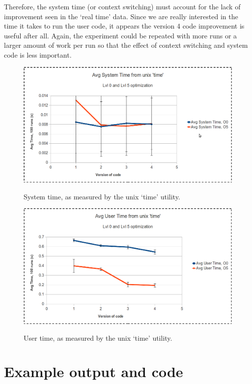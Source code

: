 \documentclass{article}
\begin{document}
Therefore, the system time (or context switching) must account for the lack of improvement seen in the `real time' data. Since we are really interested in the time it takes to run the user code, it appears the version 4 code improvement is useful after all. Again, the experiment could be repeated with more runs or a larger amount of work per run so that the effect of context switching and system code is less important. 
\begin{figure}[H]  
\centering
\caption{System time, as measured by the unix `time' utility.}
\includegraphics[scale=.40]{system_time.png}
\label{}
\end{figure}





\begin{figure}[H]   
\centering
\caption{User time, as measured by the unix `time' utility.}
\includegraphics[scale=.40]{user_time.png}
\label{}
\end{figure}

\section{Example output and code} 
\end{document}
